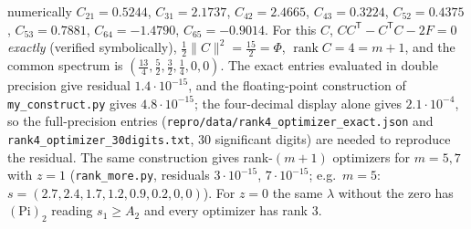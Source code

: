 \documentclass[
  11pt,
  a4paper,
]{article}
\begin{document}
numerically \(C_{21}=0.5244\), \(C_{31}=2.1737\), \(C_{42}=2.4665\),
\(C_{43}=0.3224\), \(C_{52}=0.4375\), \(C_{53}=0.7881\),
\(C_{64}=-1.4790\), \(C_{65}=-0.9014\). For this \(C\),
\(CC^{\mathsf T}-C^{\mathsf T}C-2F=0\) \emph{exactly} (verified
symbolically), \(\tfrac12\|C\|^2=\tfrac{15}2=\Phi\),
\(\operatorname{rank}C=4=m+1\), and the common spectrum is
\((\tfrac{13}4,\allowbreak{}\tfrac52,\allowbreak{}\tfrac32,\allowbreak{}\tfrac14,\allowbreak{}0,\allowbreak{}0)\). The exact entries
evaluated in double precision give residual \(1.4\cdot10^{-15}\), and
the floating-point construction of {\small\texttt{my\_\allowbreak{}construct.\allowbreak{}py}} gives
\(4.8\cdot10^{-15}\); the four-decimal display alone gives
\(2.1\cdot10^{-4}\), so the full-precision entries
({\small\texttt{repro/\allowbreak{}data/\allowbreak{}rank4\_\allowbreak{}optimizer\_\allowbreak{}exact.\allowbreak{}json}} and
{\small\texttt{rank4\_\allowbreak{}optimizer\_\allowbreak{}30digits.\allowbreak{}txt}}, 30 significant digits) are
needed to reproduce the residual. The same construction gives
rank-\((m+1)\) optimizers for \(m=5,\allowbreak{}7\) with \(z=1\)
({\small\texttt{rank\_\allowbreak{}more.\allowbreak{}py}}, residuals \(3\cdot10^{-15}\),
\(7\cdot10^{-15}\); e.g.~\(m=5\): \(s=(2.7,\allowbreak{}2.4,\allowbreak{}1.7,\allowbreak{}1.2,\allowbreak{}0.9,\allowbreak{}0.2,\allowbreak{}0,\allowbreak{}0)\)).
For \(z=0\) the same \(\lambda\) without the zero has
\((\mathrm{Pi})_2\) reading \(s_1\ge A_2\) and every optimizer has rank
\(3\).
\end{document}

